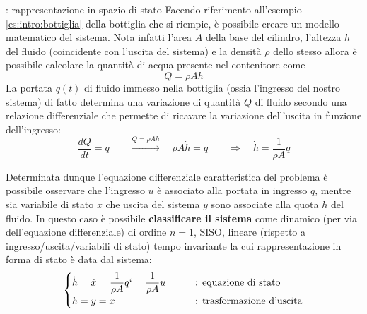 	\begin{esempio}{: rappresentazione in spazio di stato} \label{es:intro:bottiglia-2}
		Facendo riferimento all'esempio \ref{es:intro:bottiglia} della bottiglia che si riempie, è possibile creare un modello matematico del sistema. Nota infatti l'area $A$ della base del cilindro, l'altezza $h$ del fluido (coincidente con l'uscita del sistema) e la densità $\rho$ dello stesso allora è possibile calcolare la quantità di acqua presente nel contenitore come
		\[ Q = \rho A h\]
		La portata $q(t)$ di fluido immesso nella bottiglia (ossia l'ingresso del nostro sistema) di fatto determina una variazione di quantità $Q$ di fluido secondo una relazione differenziale che permette di ricavare la variazione dell'uscita in funzione dell'ingresso:
		\[ \frac {dQ}{dt}=q \qquad \xrightarrow{Q = \rho A h}\quad \rho A\dot h = q \qquad \Rightarrow \quad \dot h = \frac 1{\rho A} q \]
		
		Determinata dunque l'equazione differenziale caratteristica del problema è possibile osservare che l'ingresso $u$ è associato alla portata in ingresso $q$, mentre sia variabile di stato $x$ che uscita del sistema $y$ sono associate alla quota $h$ del fluido. In questo caso è possibile \textbf{classificare il sistema} come dinamico (per via dell'equazione differenziale) di ordine $n=1$, SISO, lineare (rispetto a ingresso/uscita/variabili di stato) tempo invariante la cui rappresentazione in forma di stato è data dal sistema:
		\[ \begin{cases}
			\dot h = \dot x = \dfrac 1 {\rho A} q` = \dfrac 1 {\rho A} u \qquad & \textrm{: equazione di stato} \\
			h = y = x & \textrm{: trasformazione d'uscita} \\
		\end{cases} \]
		
	\end{esempio}
	
